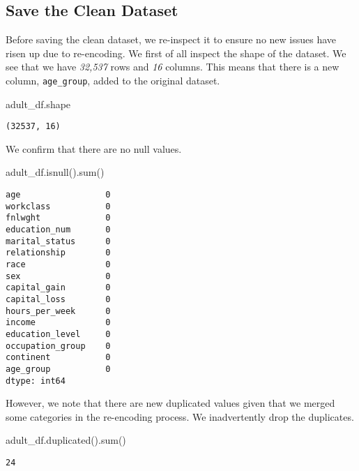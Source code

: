 \documentclass[
  letterpaper,
  DIV=11,
  numbers=noendperiod]{scrartcl}
\newenvironment{Shaded}{\begin{snugshade}}{\end{snugshade}}
\newcommand{\BuiltInTok}[1]{\textcolor[rgb]{0.00,0.23,0.31}{#1}}
\newcommand{\NormalTok}[1]{\textcolor[rgb]{0.00,0.23,0.31}{#1}}
\begin{document}
\subsection{Save the Clean Dataset}\label{save-the-clean-dataset}

Before saving the clean dataset, we re-inspect it to ensure no new
issues have risen up due to re-encoding. We first of all inspect the
shape of the dataset. We see that we have \emph{32,537} rows and
\emph{16} columns. This means that there is a new column,
\texttt{age\_group}, added to the original dataset.

\begin{Shaded}
\begin{Highlighting}[]
\NormalTok{adult\_df.shape}
\end{Highlighting}
\end{Shaded}

\begin{verbatim}
(32537, 16)
\end{verbatim}

We confirm that there are no null values.

\begin{Shaded}
\begin{Highlighting}[]
\NormalTok{adult\_df.isnull().}\BuiltInTok{sum}\NormalTok{()}
\end{Highlighting}
\end{Shaded}

\begin{verbatim}
age                 0
workclass           0
fnlwght             0
education_num       0
marital_status      0
relationship        0
race                0
sex                 0
capital_gain        0
capital_loss        0
hours_per_week      0
income              0
education_level     0
occupation_group    0
continent           0
age_group           0
dtype: int64
\end{verbatim}

However, we note that there are new duplicated values given that we
merged some categories in the re-encoding process. We inadvertently drop
the duplicates.

\begin{Shaded}
\begin{Highlighting}[]
\NormalTok{adult\_df.duplicated().}\BuiltInTok{sum}\NormalTok{()}
\end{Highlighting}
\end{Shaded}

\begin{verbatim}
24
\end{verbatim}
\end{document}
